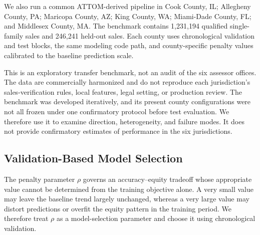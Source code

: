\documentclass[10pt]{article}
\theoremstyle{definition}
\newcommand{\1}{\mathbf{1}}
\newcommand{\advisorchange}[1]{{\color{blue}#1}}
\begin{document}
{{We also run a common ATTOM-derived pipeline in Cook County, IL; Allegheny County, PA; Maricopa County, AZ; King County, WA; Miami-Dade County, FL; and Middlesex County, MA. The benchmark contains 1,231,194 qualified single-family sales and 246,241 held-out sales. Each county uses chronological validation and test blocks, the same modeling code path, and county-specific penalty values calibrated to the baseline prediction scale.

\advisorchange{This is an exploratory transfer benchmark, not an audit of the six assessor offices.} The data are commercially harmonized and do not reproduce each jurisdiction's sales-verification rules, local features, legal setting, or production review. The benchmark was developed iteratively, and its present county configurations were not all frozen under one confirmatory protocol before test evaluation. We therefore use it to examine direction, heterogeneity, and failure modes. It does not provide confirmatory estimates of performance in the six jurisdictions.


{
\color{red}
\subsection{Validation-Based Model Selection}
\label{subsec:selection}


The penalty parameter \(\rho\) governs an accuracy--equity tradeoff whose appropriate value cannot be determined from the training objective alone. A very small value may leave the baseline trend largely unchanged, whereas a very large value may distort predictions or overfit the equity pattern in the training period. We therefore treat \(\rho\) as a model-selection parameter and choose it using chronological validation.

}}}
\end{document}
